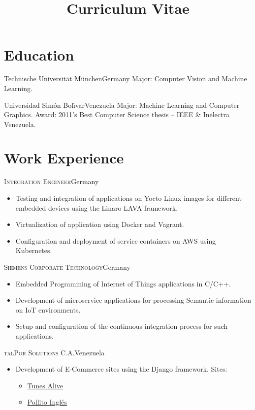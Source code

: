 \documentclass[10pt]{moderncv}
\title{Curriculum Vitae}
\begin{document}
\maketitle

\section{Education}

  {Technische Universit\"at M\"unchen}{Germany}{}{%
    Major: Computer Vision and Machine Learning.
  }

  {Universidad Sim\'on Bol\'{\i}var}{Venezuela}{}{%
    Major: Machine Learning and Computer Graphics.
    \newline
    Award: 2011's Best Computer Science thesis -- IEEE \& Inelectra Venezuela.
  }

\section{Work Experience}

{\textsc{Integration Engineer}}{Germany}{}{%
\begin{itemize}
    \item Testing and integration of applications on Yocto Linux images for 
      different embedded devices using the Linaro LAVA framework.
    \item Virtualization of application using Docker and Vagrant.
    \item Configuration and deployment of service containers on AWS using 
      Kubernetes.
\end{itemize}
}

{\textsc{Siemens Corporate Technology}}{Germany}{}{%
\begin{itemize}
  \item Embedded Programming of Internet of Things applications in C/C++.
  \item Development of microservice applications for processing Semantic 
    information on IoT environments.
  \item Setup and configuration of the continuous integration process for 
    such applications.
\end{itemize}
}

{\textsc{talPor Solutions C.A.}}{Venezuela}{}{%
\begin{itemize}
  \item Development of E-Commerce sites using the Django framework. Sites:
    \begin{itemize}
      \item \href{http://tunesalive.com}{Tunes Alive}
      \item \href{http://pollitoingles.com}{Pollito Ingl\'es}
    \end{itemize}
\end{itemize}
}
\end{document}
